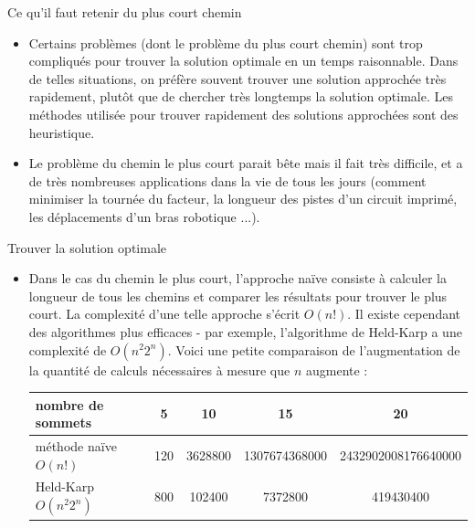 \begin{frame}{Ce qu'il faut retenir du plus court chemin}
  
  \begin{itemize}
    \item Certains problèmes (dont le problème du plus court chemin) sont trop compliqués pour trouver la \alert{solution optimale} en un temps \alert{raisonnable}. Dans de telles situations, on préfère souvent trouver une solution approchée très rapidement, plutôt que de chercher très longtemps la solution optimale. Les méthodes utilisée pour trouver rapidement des solutions approchées sont des \alert{heuristique}.
    \item Le problème du chemin le plus court parait bête mais il fait très difficile, et a de très nombreuses applications dans la vie de tous les jours (comment minimiser la tournée du facteur, la longueur des pistes d'un circuit imprimé, les déplacements d'un bras robotique ...).
  \end{itemize}

  \begin{block}{Trouver la solution optimale}
    
    \begin{itemize}
      \item Dans le cas du chemin le plus court, l'approche naïve consiste à calculer la longueur de tous les chemins et comparer les résultats pour trouver le plus court. La complexité d'une telle approche s'écrit $O(n!)$. Il existe cependant des algorithmes plus efficaces - par exemple, l'algorithme de Held-Karp a une complexité de $O(n^{2}2^n)$. Voici une petite comparaison de l'augmentation de la quantité de calculs nécessaires à mesure que $n$ augmente :

      \bigskip

      \begin{center}
        \begin{tabular}{|l|cccc|}
          \hline
          nombre de sommets       & 5   & 10      & 15            & 20 \\
          \hline
          méthode naïve $O(n!)$   & 120 & 3628800 & 1307674368000 & 2432902008176640000 \\
          Held-Karp $O(n^{2}2^n)$ & 800 & 102400  & 7372800       & 419430400 \\
          \hline
        \end{tabular} 
      \end{center}


\end{itemize}
\end{block}
\end{frame}
